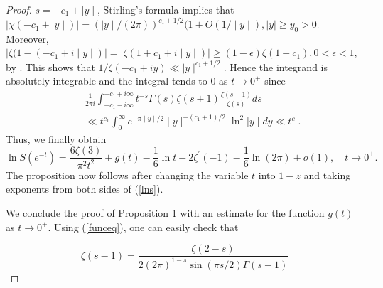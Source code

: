 \documentclass{article}
\begin{document}
\begin{proof}
 $s=-c_1\pm\mid y\mid$, Stirling's formula implies that
 $\mid\chi(-c_1\pm \mid y\mid)\mid=
 (\mid y\mid/(2\pi))^{c_1+1/2}(1+O(1/\mid y\mid), \mid y\mid\ge
 y_0>0$. Moreover, $\mid\zeta(1-(-c_1+i\mid y\mid)\mid
 =\mid\zeta(1+c_1+i\mid y\mid)\mid\ge (1-\epsilon)\zeta(1+c_1),
 0<\epsilon<1$, by \cite[Thm.\ 9.1, p.\ 235]{ivic2003}. This shows that
 $1/\zeta(-c_1+iy)\ll\mid y\mid^{c_1+1/2}$.
 Hence the integrand is absolutely integrable and the integral tends to $0$ as
 $t\to 0^+$ since
 \begin{eqnarray}
 & & \frac{1}{2\pi i}\int_{-c_1-i\infty}^{-c_1+i\infty}
 t^{-s}\Gamma(s)\zeta(s+1)\frac{\zeta(s-1)}{\zeta(s)}ds \nonumber
 \\
 & & \ll t^{c_1}\int_0^{\infty}e^{-\pi\mid y\mid/2} \mid
 y\mid^{-(c_1+1)/2}\ln^2{\mid y\mid}dy\ll t^{c_1}. \nonumber
 \end{eqnarray}
 Thus, we finally obtain
 \begin{equation}\label{lns}
 \ln{S(e^{-t})}=\frac{6\zeta(3)}{\pi^2 t^2} +g(t)
 -\frac{1}{6}\ln{t} -2\zeta^\prime(-1) -\frac{1}{6}\ln{(2\pi)}+o(1), \quad t\to
 0^+.
 \end{equation}
 The proposition now follows after changing the variable $t$ into
 $1-z$ and taking exponents from both sides of (\ref{lns}).

 We conclude the proof of Proposition 1 with an estimate for the
 function $g(t)$ as $t\to 0^+$. Using (\ref{funceq}), one can
 easily check that


 \begin{equation}\label{dupl}
 \zeta(s-1) =\frac{\zeta(2-s)}{2(2\pi)^{1-s}\sin{(\pi s/2)}
 \Gamma(s-1)}
 \end{equation}


\end{proof}
\end{document}
